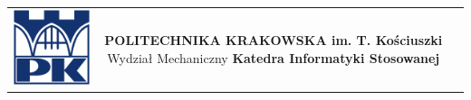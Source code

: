 \begin{titlepage}
   \begin{center}
       \begin{table}
        \centering
        \begin{tabular}{ccc}
        \begin{minipage}{.1\textwidth}
            \raggedleft
            \includegraphics[width=1\linewidth]{media/logo-pk.png}
        \end{minipage}
         &  
        \begin{minipage}{.7\textwidth}
        \centering
            \large \textbf{POLITECHNIKA KRAKOWSKA im. T. Kościuszki}\break
            Wydział Mechaniczny \break
            \large \textbf{Katedra Informatyki Stosowanej}
        \end{minipage}
        & 
        \begin{minipage}{.1\textwidth}
            \raggedright

\end{minipage}
\end{tabular}
\end{table}
\end{center}
\end{titlepage}
